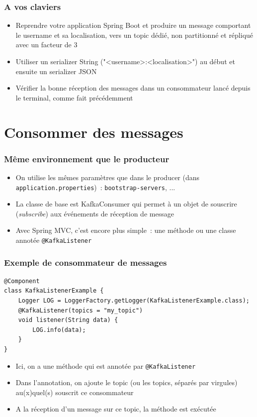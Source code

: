 \documentclass{beamer}
\begin{document}
\begin{frame}
	\frametitle{A vos claviers}
	\begin{itemize}
		\item Reprendre votre application Spring Boot et produire un message comportant le username et sa localisation, vers un topic dédié, non partitionné et répliqué avec un facteur de 3
		\item Utiliser un serializer String ("<username>:<localisation>") au début et ensuite un serializer JSON
		\item Vérifier la bonne réception des messages dans un consommateur lancé depuis le terminal, comme fait précédemment
	\end{itemize}
\end{frame}

\section{Consommer des messages}

\begin{frame}
	\frametitle{Même environnement que le producteur}
	\begin{itemize}
		\item On utilise les mêmes paramètres que dans le producer (dans \texttt{application.properties})~:
		\texttt{bootstrap-servers}, ...
		\item La classe de base est KafkaConsumer qui permet à un objet de souscrire (\textit{subscribe}) aux événements de réception de message
		\item Avec Spring MVC, c'est encore plus simple~: une méthode ou une classe annotée \texttt{@KafkaListener}
	\end{itemize}
\end{frame} 

\begin{frame}[fragile]
	\frametitle{Exemple de consommateur de messages}
\begin{lstlisting}
@Component
class KafkaListenerExample {
	Logger LOG = LoggerFactory.getLogger(KafkaListenerExample.class);
	@KafkaListener(topics = "my_topic")
	void listener(String data) {
		LOG.info(data);
	}
}
\end{lstlisting}
\begin{itemize}
	\item Ici, on a une méthode qui est annotée par \texttt{@KafkaListener}
	\item Dans l'annotation, on ajoute le topic (ou les topics, séparés par virgules) au(x)quel(s) souscrit ce consommateur
	\item A la réception d'un message sur ce topic, la méthode est exécutée
\end{itemize}
\end{frame} 
\end{document}
